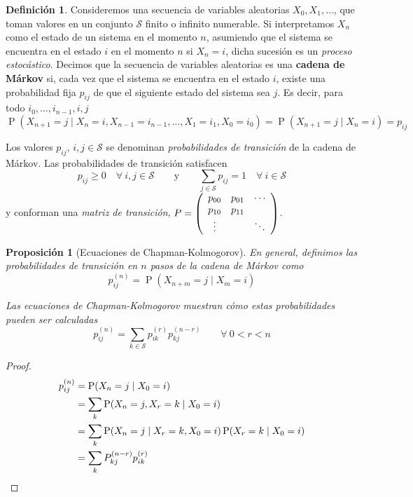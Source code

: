 \documentclass[11pt]{article}
\theoremstyle{plain}
\newtheorem*{pro}{Proposición}
\theoremstyle{definition}
\newtheorem*{defi}{Definición}
\theoremstyle{remark}
\newcommand{\deft}[1]{\textbf{#1}}  %
\newcommand{\proba}{\ensuremath{\operatorname{P}}}  %
\newcommand{\espm}[0]{\ensuremath{\mathcal{S}}}  %
\newcommand{\foralle}{\ensuremath{\forall \ }}  %
\begin{document}
    \begin{defi}
      Consideremos una secuencia de variables aleatorias $X_0, X_1, \dots$, que toman valores en un conjunto $\espm$ finito o infinito numerable. Si interpretamos $X_n$ como el estado de un sistema en el momento $n$, asumiendo que el sistema se encuentra en el estado $i$ en el momento $n$ si $X_n = i$, dicha sucesión es un \emph{proceso estocástico}. Decimos que la secuencia de variables aleatorias es una \deft{cadena de Márkov} si, cada vez que el sistema se encuentra en el estado $i$, existe una probabilidad fija $p_{ij}$ de que el siguiente estado del sistema sea $j$. Es decir, para todo $i_0, \dots, i_{n-1}, i, j$
      \[ \proba(X_{n + 1} = j \mid X_n = i, X_{n - 1} = i_{n - 1}, \dots, X_1 = i_1, X_0 = i_0) = \proba(X_{n + 1} = j \mid X_n = i) = p_{ij} \]

      Los valores $p_{ij}$, $i, j \in \espm$ se denominan \emph{probabilidades de transición} de la cadena de Márkov. Las probabilidades de transición satisfacen
      \[ p_{ij} \geq 0 \quad \foralle i, j \in \espm \qquad \text{y} \qquad \sum_{j \in \espm} p_{ij} = 1 \quad \foralle i \in \espm \]
      y conforman una \emph{matriz de transición}, $P = \left( \begin{array}{c c c}
        p_{00} & p_{01} & \cdots \\
        p_{10} & p_{11} & \\
        \vdots & & \ddots
      \end{array} \right)$.
    \end{defi}

    \begin{pro}[Ecuaciones de Chapman-Kolmogorov]
      En general, definimos las \emph{probabilidades de transición en $n$ pasos} de la cadena de Márkov como
      \[ p_{ij}^{(n)} = \proba(X_{n+m} = j \mid X_m = i) \]

      Las ecuaciones de Chapman-Kolmogorov muestran cómo estas probabilidades pueden ser calculadas
      \[ p_{ij}^{(n)} = \sum_{k \in \espm} p_{ik}^{(r)} p_{kj}^{(n - r)} \qquad \foralle 0 < r < n \]
    \end{pro}
    \begin{proof}
      \[ \begin{split}
        p_{ij}^{(n)} &= \proba(X_n = j \mid X_0 = i) \\
        &= \sum_k \proba(X_n = j, X_r = k \mid X_0 = i) \\
        &= \sum_k \proba(X_n = j \mid X_r = k, X_0 = i) \proba(X_r = k \mid X_0 = i) \\
        &= \sum_k P_{kj}^{(n - r)} p_{ik}^{(r)} \qedhere
      \end{split} \]
    \end{proof}
\end{document}
